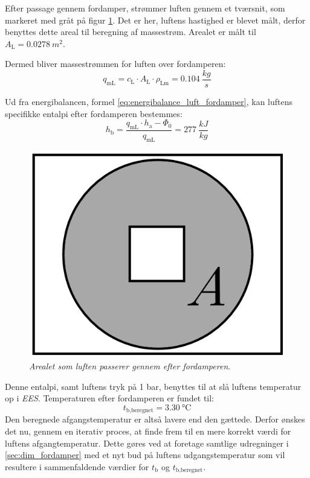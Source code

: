 \documentclass[../Hovedrapport.tex]{subfiles}
\begin{document}
\begin{minipage}[t]{0.6\textwidth}
Efter passage gennem fordamper, strømmer luften gennem et tværsnit, som markeret med gråt på figur \ref{fig:lufttvaer}. Det er her, luftens hastighed er blevet målt, derfor benyttes dette areal til beregning af massestrøm. Arealet er målt til $A_\text{L} = \SI{0,0278}{m^2}$.

Dermed bliver massestrømmen for luften over fordamperen:
\begin{equation*}
    q_\text{mL} = c_\text{L} \cdot A_\text{L} \cdot \rho_\text{Lm} = \SI{0,104}{\frac{kg}{s}}
\end{equation*}

Ud fra energibalancen, formel \ref{eq:energibalance_luft_fordamper}, kan luftens specifikke entalpi efter fordamperen bestemmes:
\begin{equation}
    h_\text{b} = \frac{ q_\text{mL} \cdot h_\text{a} - \Phi_0 }{ q_\text{mL} } = \SI{277}{\frac{kJ}{kg}}
\end{equation}
\end{minipage} \hfill 
\begin{minipage}[t]{0.28\textwidth}
\begin{figure}[H]
    \centering
    \includegraphics[width=1\textwidth]{Billeder/lufttvaer.png}
    \caption{\textit{Arealet som luften passerer gennem efter fordamperen}.}
    \label{fig:lufttvaer}
\end{figure}
\end{minipage}

Denne entalpi, samt luftens tryk på 1 bar, benyttes til at slå luftens temperatur op i \textit{EES}. Temperaturen efter fordamperen er fundet til:
\begin{equation}
    t_\text{b,beregnet} = \SI{3,30}{\celsius}
\end{equation}
Den beregnede afgangstemperatur er altså lavere end den gættede. Derfor ønskes det nu, gennem en iterativ proces, at finde frem til en mere korrekt værdi for luftens afgangtemperatur. Dette gøres ved at foretage samtlige udregninger i \ref{sec:dim_fordamper} med et nyt bud på luftens udgangstemperatur som vil resultere i sammenfaldende værdier for $t_\text{b}$ og $t_\text{b,beregnet}$.
\end{document}
